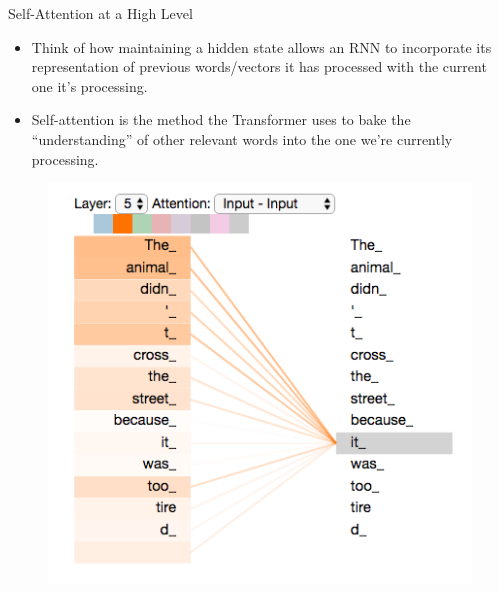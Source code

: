 \documentclass[handout]{beamer}
\begin{document}
\begin{frame}{Self-Attention at a High Level}
\begin{scriptsize}



\begin{itemize}


\item Think of how maintaining a hidden state allows an RNN to incorporate its representation of previous words/vectors it has processed with the current one it's processing. 

\item Self-attention is the method the Transformer uses to bake the ``understanding'' of other relevant words into the one we're currently processing.


\end{itemize}

\end{scriptsize}

\begin{figure}[h]
        	\includegraphics[scale = 0.4]{pics/transformer_self-attention_visualization.png}
        \end{figure}  


\end{frame}
\end{document}
